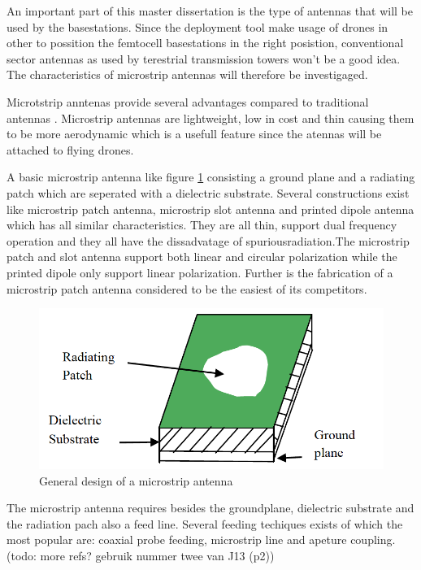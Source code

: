 An important part of this master dissertation is the type of antennas that will be used by the basestations. Since the deployment tool make usage
of drones in other to possition the femtocell basestations in the right posistion,  conventional 
sector antennas as used by terestrial transmission towers won't be a good idea. The characteristics of microstrip antennas will therefore be investigaged.

Microtstrip anntenas provide several advantages compared to traditional antennas \cite{J13_singh2011micro, J14_antennadesign}. Microstrip antennas
are lightweight, low in cost and thin causing them to be more aerodynamic which is  a usefull feature since the atennas will be attached
to flying drones.

A basic microstrip antenna like figure \ref{fig:basicpatchantenna} consisting a ground plane and
a radiating patch which are seperated with a dielectric substrate. Several constructions exist like microstrip patch antenna, microstrip slot antenna and printed dipole antenna which
has all similar characteristics. They are all thin, support dual frequency operation and they all have the dissadvatage of \gls{spuriousradiation}.The microstrip patch and slot antenna support both linear
and circular polarization while the printed dipole only support linear polarization. Further is the fabrication of a microstrip patch antenna considered to be the easiest of its competitors. 

\begin{figure}[H]
  \includegraphics[width=\textwidth/2]{../images/patchantenna.png}
  \caption{General design of a microstrip antenna}
  \label{fig:basicpatchantenna}
\end{figure}

The microstrip antenna requires besides the groundplane, dielectric substrate and the radiation pach also a feed line. Several feeding techiques exists of which the most popular are: coaxial probe feeding, microstrip line and apeture coupling. %
(todo: more refs? gebruik nummer twee van J13 (p2))

